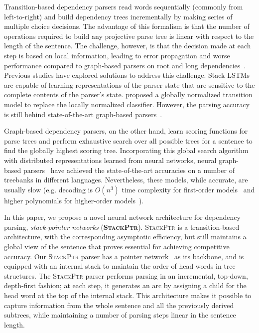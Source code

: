 \documentclass[11pt,a4paper]{article}
\begin{document}
Transition-based dependency parsers read words sequentially (commonly from left-to-right) and build dependency trees incrementally by making series of multiple choice  decisions. The advantage of this formalism is that the number of operations required to build any projective parse tree is linear with respect to the length of the sentence. 
The challenge, however, is that the decision made at each step is based on local information, leading to error propagation and worse performance compared to graph-based parsers on root and long dependencies~\citep{mcdonald2011analyzing}.
Previous studies have explored solutions to address this challenge.
Stack LSTMs~\citep{dyer-EtAl:2015:ACL-IJCNLP,ballesteros-dyer-smith:2015:EMNLP,ballesteros-EtAl:2016:EMNLP2016} are capable of learning representations of the parser state that are sensitive to the complete contents of the parser's state. 
\citet{andor-EtAl:2016:P16-1} proposed a globally normalized transition model to replace the locally normalized classifier.
However, the parsing accuracy is still behind state-of-the-art graph-based parsers~\citep{dozat2017:ICLR}. 

Graph-based dependency parsers, on the other hand, learn scoring functions for parse trees and perform exhaustive search over all possible trees for a sentence to find the globally highest scoring tree. 
Incorporating this global search algorithm with distributed representations learned from neural networks, neural graph-based parsers~\citep{TACL885,wang-chang:2016:P16-1,kuncoro-EtAl:2016:EMNLP2016,dozat2017:ICLR} have achieved the state-of-the-art accuracies on a number of treebanks in different languages.
Nevertheless, these models, while accurate, are usually slow (e.g. decoding is $O(n^3)$ time complexity for first-order models~\cite{McDonald:2005,McDonald:2005b} and higher polynomials for higher-order models~\citep{mcdonald2006online,Koo:2010,ma2012probabilistic,ma-zhao:2012:POSTERS}).

In this paper, we propose a novel neural network architecture for dependency parsing, \emph{stack-pointer networks} (\textbf{\textsc{StackPtr}}).
\textsc{StackPtr} is a transition-based architecture, with the corresponding asymptotic efficiency, but still maintains a global view of the sentence that proves essential for achieving competitive accuracy.
Our \textsc{StackPtr} parser has a pointer network~\citep{vinyals2015pointer} as its backbone, and is equipped with an internal stack to maintain the order of head words in tree structures. 
The \textsc{StackPtr} parser performs parsing in an incremental, top-down, depth-first fashion; at each step, it generates an arc by assigning a child for the head word at the top of the internal stack. 
This architecture makes it possible to capture information from the whole sentence and all the previously derived subtrees, while maintaining a number of parsing steps linear in the sentence length.
\end{document}
